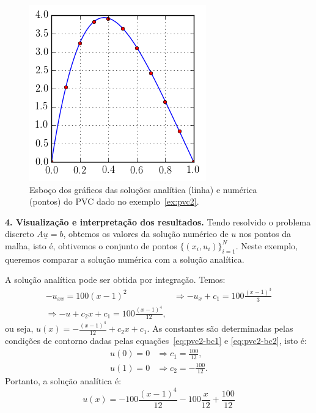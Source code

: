 \begin{sol}
\begin{figure}
  \centering
  \includegraphics{./cap_pvc/pics/ex_pvc2/ex_pvc2}
  \caption{Esboço dos gráficos das soluções analítica (linha) e numérica (pontos) do PVC dado no exemplo~\ref{ex:pvc2}.}
  \label{fig:ex_pvc2}
\end{figure}

{\bf 4. Visualização e interpretação dos resultados.} Tendo resolvido o problema discreto $A\underline{u} = b$, obtemos os valores da solução numérico de $u$ nos pontos da malha, isto é, obtivemos o conjunto de pontos $\{(x_i, u_i)\}_{i=1}^N$. Neste exemplo, queremos comparar a solução numérica com a solução analítica.

A solução analítica pode ser obtida por integração. Temos:
\begin{equation*}
  \begin{split}
    -u_{xx} = 100(x-1)^2 &\Rightarrow -u_x + c_1 = 100\frac{(x-1)^3}{3}\\
    \Rightarrow -u + c_2x + c_1 = 100\frac{(x-1)^4}{12},
  \end{split}
\end{equation*}
ou seja, $\displaystyle u(x) = - \frac{(x-1)^4}{12} + c_2x + c_1$. As constantes são determinadas pelas condições de contorno dadas pelas equações~\eqref{eq:pvc2-bc1} e \eqref{eq:pvc2-bc2}, isto é:
\begin{equation*}
  \begin{split}
    u(0) = 0 &\Rightarrow c_1 = \frac{100}{12},\\
    u(1) = 0 &\Rightarrow c_2 = -\frac{100}{12}.
  \end{split}
\end{equation*}
Portanto, a solução analítica é:
\begin{equation}\label{eq:pvc2_analitica}
  u(x) = -100\frac{(x-1)^4}{12} - 100\frac{x}{12} + \frac{100}{12}
\end{equation}


\end{sol}
